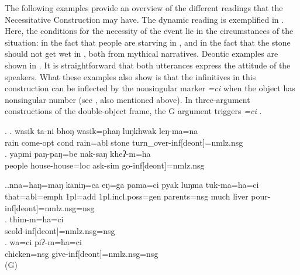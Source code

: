 The following examples provide an overview of the different readings that the Necessitative Construction may have.
The dynamic reading is exemplified in \Next. Here, the conditions for the necessity of the event lie in the circumstances of the situation: in the fact that people are starving in \Next[a], and in the fact that the stone should not get wet in \Next[b], both from mythical narratives. Deontic examples are shown in \NNext. It is straightforward that both utterances express the attitude of the speakers. What these examples also show is that the infinitives in this construction can be inflected by the nonsingular marker \emph{=ci} when the object has nonsingular number (see \NNext, also mentioned above). In three-argument constructions of the double-object frame, the G argument triggers   \emph{=ci}  \NNext[c].


\ex. \ag. wasik  ta-ni bhoŋ wasik=phaŋ luŋkhwak leŋ-ma=na\\
rain come{\sc [3sg]-opt} {\sc cond} rain{\sc =abl} stone turn\_over-{\sc inf[deont]=nmlz.nsg}\\
\bg. yapmi  paŋ-paŋ=be nak-saŋ kheʔ-m=ha\\
		people house-house{\sc=loc} ask-{\sc sim} go-{\sc inf[deont]=nmlz.nsg}\\
	 

\ex.\ag.nna=haŋ=maŋ kaniŋ=ca    eŋ=ga  pama=ci pyak luŋma tuk-ma=ha=ci\\
that{\sc =abl=emph} {\sc 1pl=add} {\sc 1pl.incl.poss=gen} parents{\sc =nsg} much liver pour{\sc -inf[deont]=nmlz.nsg=nsg} \\
	
\bg. thim-m=ha=ci\\
	scold{\sc -inf[deont]=nmlz.nsg=nsg}\\
\bg. wa=ci piʔ-m=ha=ci\\
chicken{\sc =nsg} give-{\sc inf[deont]=nmlz.nsg=nsg}\\
 (G)
	
